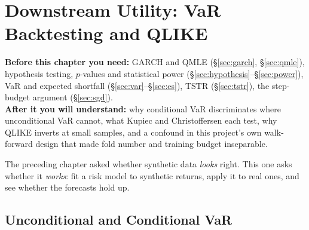 \chapter{Downstream Utility: VaR Backtesting and QLIKE}
\label{ch:downstream}

\begin{tcolorbox}[feynbox={Sky}{BBg},title={Before and After}]
\textbf{Before this chapter you need:} GARCH and QMLE
(\S\ref{sec:garch}, \S\ref{sec:qmle}), hypothesis testing, $p$-values and
statistical power (\S\ref{sec:hypothesis}--\S\ref{sec:power}), VaR and expected
shortfall (\S\ref{sec:var}--\S\ref{sec:es}), TSTR (\S\ref{sec:tstr}), the
step-budget argument (\S\ref{sec:sgd}).\\
\textbf{After it you will understand:} why conditional VaR discriminates where
unconditional VaR cannot, what Kupiec and Christoffersen each test, why QLIKE
inverts at small samples, and a confound in this project's own walk-forward
design that made fold number and training budget inseparable.
\end{tcolorbox}

The preceding chapter asked whether synthetic data \emph{looks} right. This one
asks whether it \emph{works}: fit a risk model to synthetic returns, apply it to
real ones, and see whether the forecasts hold up.

\section{Unconditional and Conditional VaR}
\label{sec:condvar}




